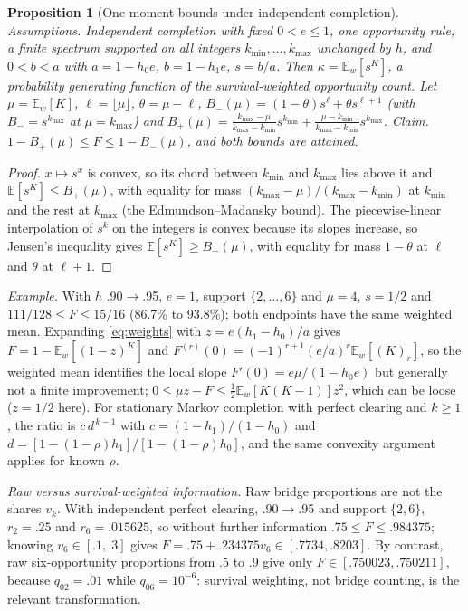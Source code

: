 \documentclass[11pt]{article}
\newtheorem{proposition}{Proposition}
\newcommand{\E}{\mathbb E}
\begin{document}
\begin{proposition}[One-moment bounds under independent completion]\label{prop:moment}
\emph{Assumptions.} Independent completion with fixed $0<e\le1$, one opportunity
rule, a finite spectrum supported on all integers $k_{\min},\ldots,k_{\max}$ unchanged by $h$, and
$0<b<a$ with $a=1-h_0e$, $b=1-h_1e$, $s=b/a$. Then $\kappa=\E_w[s^K]$, a probability
generating function of the survival-weighted opportunity count. Let
$\mu=\E_w[K]$, $\ell=\lfloor\mu\rfloor$, $\theta=\mu-\ell$,
$B_-(\mu)=(1-\theta)s^\ell+\theta s^{\ell+1}$ (with $B_-=s^{k_{\max}}$ at $\mu=k_{\max}$) and
$B_+(\mu)=\tfrac{k_{\max}-\mu}{k_{\max}-k_{\min}}s^{k_{\min}}+\tfrac{\mu-k_{\min}}{k_{\max}-k_{\min}}s^{k_{\max}}$. \emph{Claim.}
$1-B_+(\mu)\le F\le1-B_-(\mu)$, and both bounds are attained.
\end{proposition}
\begin{proof}
$x\mapsto s^x$ is convex, so its chord between $k_{\min}$ and $k_{\max}$ lies above it and
$\E[s^K]\le B_+(\mu)$, with equality for mass $(k_{\max}-\mu)/(k_{\max}-k_{\min})$ at $k_{\min}$ and the rest at
$k_{\max}$ (the Edmundson--Madansky bound). The piecewise-linear interpolation of $s^k$
on the integers is convex because its slopes increase, so Jensen's inequality
gives $\E[s^K]\ge B_-(\mu)$, with equality for mass $1-\theta$ at $\ell$ and $\theta$
at $\ell+1$.
\end{proof}
\emph{Example.} With $h$ .90$\to$.95, $e=1$, support $\{2,\dots,6\}$ and $\mu=4$,
$s=1/2$ and $111/128\le F\le15/16$ (86.7\% to 93.8\%); both endpoints have the same
weighted mean. Expanding \eqref{eq:weights} with $z=e(h_1-h_0)/a$ gives
$F=1-\E_w[(1-z)^K]$ and $F^{(r)}(0)=(-1)^{r+1}(e/a)^r\E_w[(K)_r]$, so the weighted
mean identifies the local slope $F'(0)=e\mu/(1-h_0e)$ but generally not a finite
improvement; $0\le\mu z-F\le\tfrac12\E_w[K(K-1)]z^2$, which can be loose ($z=1/2$
here). For stationary Markov completion with perfect clearing and $k\ge1$, the
ratio is $c\,d^{\,k-1}$ with $c=(1-h_1)/(1-h_0)$ and
$d=[1-(1-\rho)h_1]/[1-(1-\rho)h_0]$, and the same convexity argument applies for
known $\rho$.

\emph{Raw versus survival-weighted information.} Raw bridge proportions are not
the shares $v_k$. With independent perfect clearing, .90$\to$.95 and support
$\{2,6\}$, $r_2=.25$ and $r_6=.015625$, so without further information
$.75\le F\le.984375$; knowing $v_6\in[.1,.3]$ gives $F=.75+.234375v_6\in[.7734,
.8203]$. By contrast, raw six-opportunity proportions from .5 to .9 give only
$F\in[.750023,.750211]$, because $q_{02}=.01$ while $q_{06}=10^{-6}$: survival
weighting, not bridge counting, is the relevant transformation.
\end{document}
